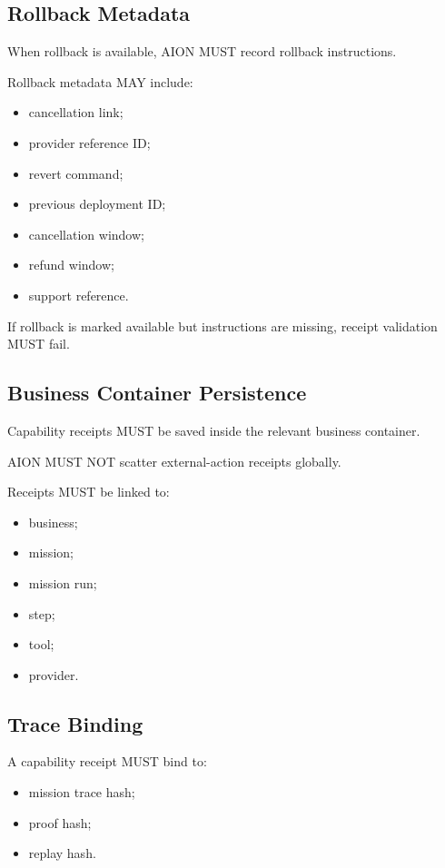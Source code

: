 \subsection{Rollback Metadata}

When rollback is available, AION MUST record rollback instructions.

Rollback metadata MAY include:

\begin{itemize}
  \item cancellation link;
  \item provider reference ID;
  \item revert command;
  \item previous deployment ID;
  \item cancellation window;
  \item refund window;
  \item support reference.
\end{itemize}

If rollback is marked available but instructions are missing, receipt validation MUST fail.

\subsection{Business Container Persistence}

Capability receipts MUST be saved inside the relevant business container.

AION MUST NOT scatter external-action receipts globally.

Receipts MUST be linked to:

\begin{itemize}
  \item business;
  \item mission;
  \item mission run;
  \item step;
  \item tool;
  \item provider.
\end{itemize}

\subsection{Trace Binding}

A capability receipt MUST bind to:

\begin{itemize}
  \item mission trace hash;
  \item proof hash;
  \item replay hash.
\end{itemize}

